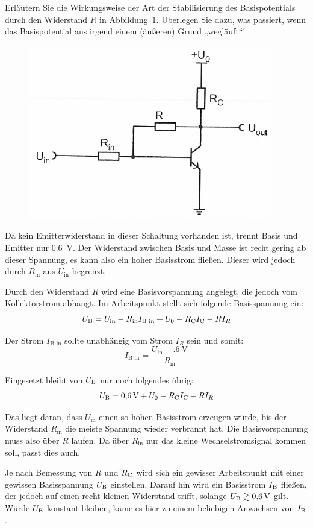 \begin{problem}
    Erläutern Sie die Wirkungsweise der Art der Stabilisierung des
    Basispotentials durch den Widerstand $R$ in Abbildung~\ref{fig:3_4-16}.
    Überlegen Sie dazu, was passiert, wenn das Basispotential aus irgend einem
    (äußeren) Grund „wegläuft“!
\end{problem}

\begin{figure}[htbp]
    \centering
    \includegraphics[width=.6\textwidth]{Anleitung/3_4-16.png}
    \caption{%
        \cite[Abbildung~3/4.16]{physik313-Anleitung}
    }
    \label{fig:3_4-16}
\end{figure}

Da kein Emitterwiderstand in dieser Schaltung vorhanden ist, trennt Basis und
Emitter nur \SI{.6}{\volt}. Der Widerstand zwischen Basis und Masse ist recht
gering ab dieser Spannung, es kann also ein hoher Basisstrom fließen. Dieser
wird jedoch durch $R_\text{in}$ aus $U_\text{in}$ begrenzt.

Durch den Widerstand $R$ wird eine Basisvorspannung angelegt, die jedoch vom
Kollektorstrom abhängt. Im Arbeitspunkt stellt sich folgende Basisspannung ein:
\[
    U_\text{B} = U_\text{in} - R_\text{in} I_\text{B in}
    + U_0 - R_\text{C} I_\text{C} - R I_R
\]

Der Strom $I_\text{B in}$ sollte unabhängig vom Strom $I_R$ sein und somit:
\[
    I_\text{B in} = \frac{U_\text{in} - \SI{.6}\volt}{R_\text{in}}
\]

Eingesetzt bleibt von $U_\text{B}$ nur noch folgendes übrig:
\[
    U_\text{B} = \SI{.6}\volt + U_0 - R_\text{C} I_\text{C} - R I_R
\]

Das liegt daran, dass $U_\text{in}$ einen so hohen Basisstrom erzeugen würde,
bis der Widerstand $R_\text{in}$ die meiste Spannung wieder verbrannt hat. Die
Basisvorspannung muss also über $R$ laufen. Da über $R_\text{in}$ nur das
kleine Wechselstromsignal kommen soll, passt dies auch.

Je nach Bemessung von $R$ und $R_\text{C}$ wird sich ein gewisser Arbeitspunkt mit
einer gewissen Basisspannung $U_\text{B}$ einstellen. Darauf hin wird ein Basisstrom
$I_\text{B}$ fließen, der jedoch auf einen recht kleinen Widerstand trifft, solange
$U_\text{B} \gtrsim \SI{.6}\volt$ gilt. Würde $U_\text{B}$ konstant bleiben, käme es hier zu
einem beliebigen Anwachsen von $I_\text{B}$.

